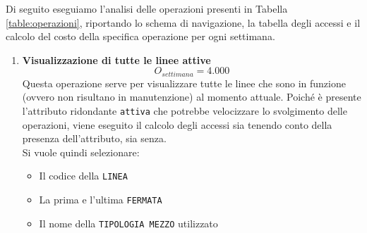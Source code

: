 \documentclass[12pt,a4paper]{report}
\begin{document}
\noindent Di seguito eseguiamo l'analisi delle operazioni presenti in Tabella \ref{table:operazioni}, riportando lo schema di navigazione, la tabella degli accessi e il calcolo del costo della specifica operazione per ogni settimana.
\begin{enumerate}[label=\textbf{\arabic*)}]


   \item \textbf{Visualizzazione di tutte le linee attive} \label{op1} \\
    \[ {O_{settimana} = 4.000} \]
    Questa operazione serve per visualizzare tutte le linee che sono in funzione (ovvero non risultano in manutenzione) al momento attuale. Poiché è presente l'attributo ridondante  \texttt{attiva} che potrebbe velocizzare lo svolgimento delle operazioni, viene eseguito il calcolo degli accessi sia tenendo conto della presenza dell'attributo, sia senza.\\
    Si vuole quindi selezionare:
    \begin{itemize}
	\renewcommand\labelitemi{--}
    \item Il codice della \texttt{LINEA}
    \item La prima e l'ultima \texttt{FERMATA}
    \item Il nome della \texttt{TIPOLOGIA MEZZO} utilizzato
    \end{itemize}


\end{enumerate}
\end{document}
